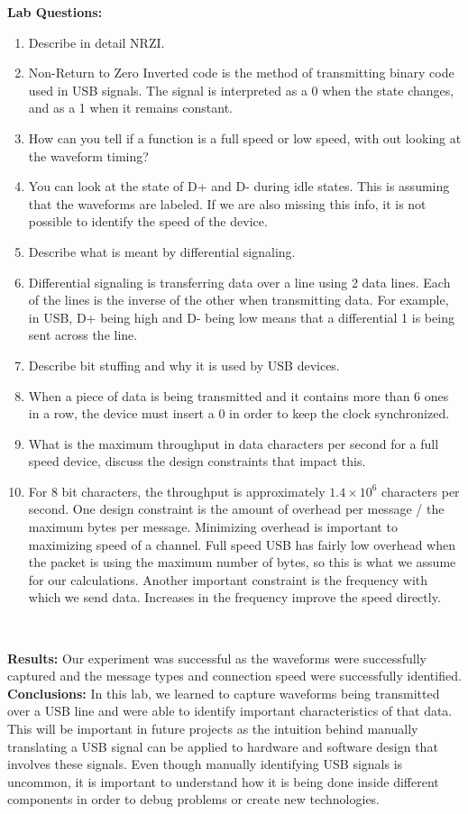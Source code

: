 \documentclass{article}
\newcommand{\Q}{\textbf{Q:}}
\newcommand{\A}{\textbf{A:}}
\newcommand{\sect}[1]{\noindent\textbf{#1}}
\begin{document}
\sect{Lab Questions:}

\begin{enumerate}
	\item[\Q] Describe in detail NRZI.
	\item[\A] Non-Return to Zero Inverted code is the method of transmitting binary code used in USB signals. The signal is interpreted as a 0 when the state changes, and as a 1 when it remains constant.
	\item[\Q] How can you tell if a function is a full speed or low speed, with out looking at the waveform timing?
	\item[\A] You can look at the state of D+ and D- during idle states. This is assuming that the waveforms are labeled. If we are also missing this info, it is not possible to identify the speed of the device.
	\item[\Q] Describe what is meant by differential signaling.
	\item[\A] Differential signaling is transferring data over a line using 2 data lines. Each of the lines is the inverse of the other when transmitting data. For example, in USB, D+ being high and D- being low means that a differential 1 is being sent across the line. 
	\item[\Q] Describe bit stuffing and why it is used by USB devices.
	\item[\A] When a piece of data is being transmitted and it contains more than 6 ones in a row, the device must insert a 0 in order to keep the clock synchronized.
	\item[\Q] What is the maximum throughput in data characters per second for a full speed device, discuss the design constraints that impact this.
	\item[\A] For 8 bit characters, the throughput is approximately $1.4\times 10^{6}$ characters per second. One design constraint is the amount of overhead per message / the maximum bytes per message. Minimizing overhead is important to maximizing speed of a channel. Full speed USB has fairly low overhead when the packet is using the maximum number of bytes, so this is what we assume for our calculations. Another important constraint is the frequency with which we send data. Increases in the frequency improve the speed directly.
\end{enumerate}~

\sect{Results:} Our experiment was successful as the waveforms were successfully captured and the message types and connection speed were successfully identified.\\

\sect{Conclusions:} In this lab, we learned to capture waveforms being transmitted over a USB line and were able to identify important characteristics of that data. This will be important in future projects as the intuition behind manually translating a USB signal can be applied to hardware and software design that involves these signals. Even though manually identifying USB signals is uncommon, it is important to understand how it is being done inside different components in order to debug problems or create new technologies. 
\end{document}
